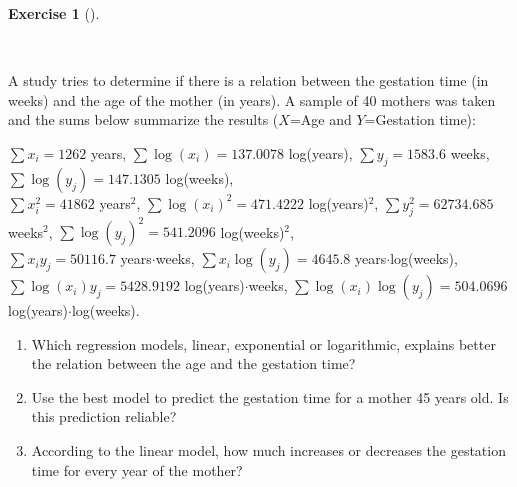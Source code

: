 \documentclass[
  a4paper,
]{scrreport}
\theoremstyle{definition}
\newtheorem{exercise}{Exercise}[chapter]
\theoremstyle{remark}
\begin{document}
\leavevmode{}%
\begin{exercise}[]\label{exr-2}

~

A study tries to determine if there is a relation between the gestation
time (in weeks) and the age of the mother (in years). A sample of 40
mothers was taken and the sums below summarize the results (\(X\)=Age
and \(Y\)=Gestation time):

\(\sum x_i=1262\) years, \(\sum \log(x_i)=137.0078\) log(years),
\(\sum y_j=1583.6\) weeks, \(\sum \log(y_j)=147.1305\) log(weeks),\\
\(\sum x_i^2=41862\) years\(^2\), \(\sum \log(x_i)^2=471.4222\)
log(years)\(^2\), \(\sum y_j^2=62734.685\) weeks\(^2\),
\(\sum \log(y_j)^2=541.2096\) log(weeks)\(^2\),\\
\(\sum x_iy_j=50116.7\) years\(\cdot\)weeks,
\(\sum x_i\log(y_j)=4645.8\) years\(\cdot\)log(weeks),
\(\sum \log(x_i)y_j=5428.9192\) log(years)\(\cdot\)weeks,
\(\sum \log(x_i)\log(y_j)=504.0696\) log(years)\(\cdot\)log(weeks).

\begin{enumerate}
\def\labelenumi{\alph{enumi}.}
\item
  Which regression models, linear, exponential or logarithmic, explains
  better the relation between the age and the gestation time?
\item
  Use the best model to predict the gestation time for a mother 45 years
  old. Is this prediction reliable?
\item
  According to the linear model, how much increases or decreases the
  gestation time for every year of the mother?
\end{enumerate}

\end{exercise}
\end{document}
